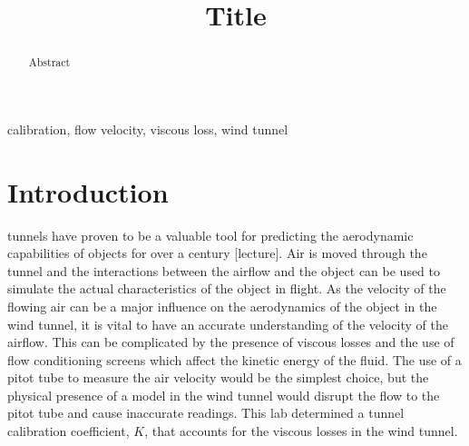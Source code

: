 \documentclass[journal,letterpaper]{IEEEtran}
\begin{document}
\title{Title}

\author{
}

\maketitle
\thispagestyle{empty}

\begin{abstract}
Abstract
\end{abstract}

\begin{IEEEkeywords}
calibration, flow velocity, viscous loss, wind tunnel
\end{IEEEkeywords}


\section{Introduction}


 tunnels have proven to be a valuable tool for predicting the aerodynamic capabilities of objects for over a century [lecture].
Air is moved through the tunnel and the interactions between the airflow and the object can be used to simulate the actual characteristics of the object in flight.
As the velocity of the flowing air can be a major influence on the aerodynamics of the object in the wind tunnel, it is vital to have an accurate understanding of the velocity of the airflow.
This can be complicated by the presence of viscous losses and the use of flow conditioning screens which affect the kinetic energy of the fluid.
The use of a pitot tube to measure the air velocity would be the simplest choice, but the physical presence of a model in the wind tunnel would disrupt the flow to the pitot tube and cause inaccurate readings.
This lab determined a tunnel calibration coefficient, $K$, that accounts for the viscous losses in the wind tunnel.
\end{document}
